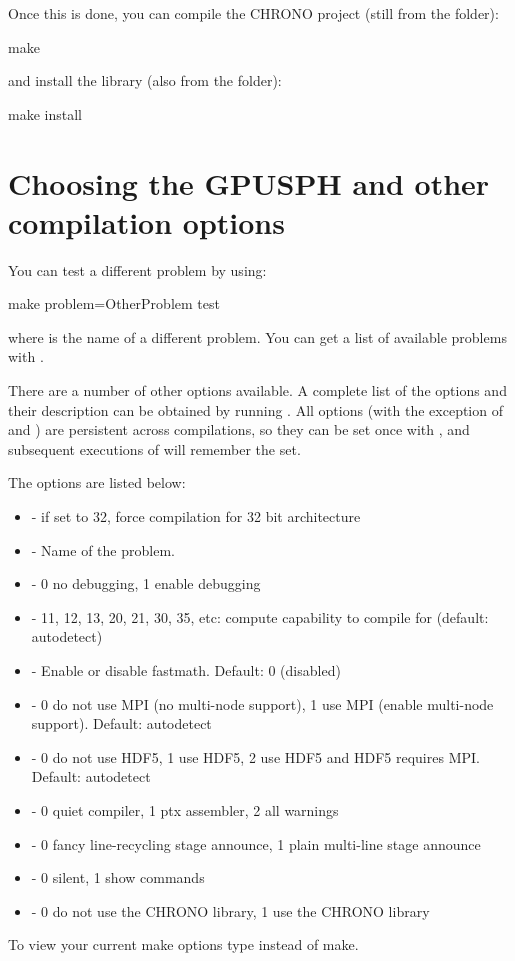 \documentclass{../GPUSPHtemplate}
\begin{document}
Once this is done, you can compile the CHRONO project
(still from the  folder):
\begin{shellcode}
make
\end{shellcode}
and install the library (also from the  folder):
\begin{shellcode}
make install
\end{shellcode}



\section{Choosing the GPUSPH  and other compilation options}\label{sec:compileoptions}

You can test a different problem by using:
\begin{shellcode}
make problem=OtherProblem test
\end{shellcode}
where  is the name of a different problem. You can get
a list of available problems with .

There are a number of other options available. A complete list of the
options and their description can be obtained by running . All options (with the exception of  and
) are persistent across compilations, so they can be set once
with , and subsequent executions of 
will remember the  set.

The  options are listed below:
\begin{itemize}
\item {} - if set to 32, force compilation for 32 bit architecture
\item {} - Name of the problem.
\item {} - 0 no debugging, 1 enable debugging
\item {} - 11, 12, 13, 20, 21, 30, 35, etc: compute capability to compile for (default: autodetect)
\item {} - Enable or disable fastmath. Default: 0 (disabled)
\item {} - 0 do not use MPI (no multi-node support), 1 use MPI (enable multi-node support). Default: autodetect
\item {} - 0 do not use HDF5, 1 use HDF5, 2 use HDF5 and HDF5 requires MPI. Default: autodetect
\item {} - 0 quiet compiler, 1 ptx assembler, 2 all warnings
\item {} - 0 fancy line-recycling stage announce, 1 plain multi-line stage announce
\item {} - 0 silent, 1 show commands
\item {} - 0 do not use the CHRONO library, 1 use the CHRONO library
\end{itemize}
To view your current make options type  instead of make.
\end{document}
